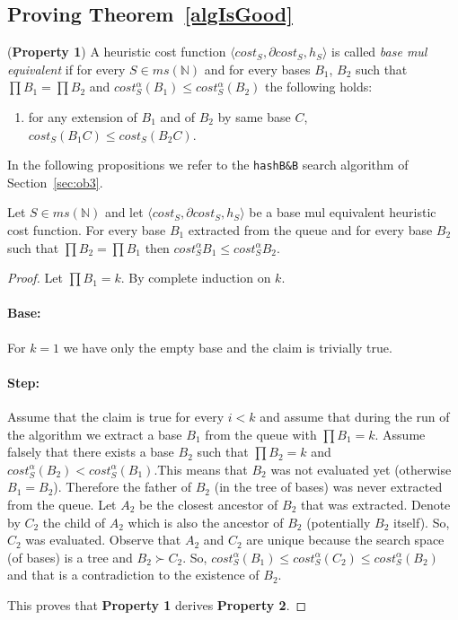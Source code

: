 \documentclass[envcountsame]{llncs}
\newcommand\tuple[1]{\langle #1 \rangle}
\newcommand{\intMultiSet}{\mathit{ms(\mathbb{N})}}
\newcommand{\cost}{\mathit{cost}}
\begin{document}
\subsection{Proving Theorem~\ref{algIsGood}}

\begin{definition}(\textbf{Property 1})
\label{dBME}
A heuristic cost function $\tuple{\cost_S,\partial \cost_S,h_S}$ is
called \emph{base mul equivalent} if for every $S\in\intMultiSet$ and
for every bases $B_1$, $B_2$ such that $\prod B_1 = \prod B_2$ and
$\cost^\alpha_S(B_1) \leq \cost^\alpha_S(B_2)$ the following holds:
\begin{enumerate}
   \item for any extension of $B_1$ and of $B_2$ by same base $C$,
          $\cost_S(B_1C) \leq \cost_S(B_2C)$.
\end{enumerate}
\end{definition} 

In the following propositions we refer to the \texttt{hashB\&B}
search algorithm of Section~\ref{sec:ob3}.


\begin{proposition}
\label{pBestRep}
Let $S\in\intMultiSet$ and let $\tuple{\cost_S,\partial \cost_S,h_S}$
be a base mul equivalent heuristic cost function.  For every base
$B_1$ extracted from the queue and for every base $B_2$ such that
$\prod B_2 = \prod B_1$ then $\cost_S^\alpha B_1 \leq \cost_S^\alpha B_2$.
\end{proposition}

\begin{proof}
Let $\prod B_1 = k$. By complete induction on $k$.

\paragraph{\bf Base:} 

For $k=1$ we have only the empty base and the claim is trivially true.

\paragraph{\bf Step:}  

Assume that the claim is true for every $i<k$ and assume that during
the run of the algorithm we extract a base $B_1$ from the queue with
$\prod B_1=k$. Assume falsely that there exists a base $B_2$ such that
$\prod B_2 = k$ and $\cost_S^\alpha(B_2) < \cost_S^\alpha(B_1)$.This
means that $B_2$ was not evaluated yet (otherwise $B_1=B_2$).
Therefore the father of $B_2$ (in the tree of bases) was never
extracted from the queue.  Let $A_2$ be the closest ancestor of $B_2$
that was extracted. Denote by $C_2$ the child of $A_2$ which is also
the ancestor of $B_2$ (potentially $B_2$ itself). So, $C_2$ was
evaluated.  Observe that $A_2$ and $C_2$ are unique because the search
space (of bases) is a tree and $B_2 \succ C_2$. So,
$\cost_S^\alpha(B_1) \leq \cost_S^\alpha(C_2) \leq
\cost_S^\alpha(B_2)$ and that is a contradiction to the existence of
$B_2$.  \bigskip

\noindent This proves that \textbf{Property 1} derives
\textbf{Property 2}.
\end{proof} 
\end{document}
